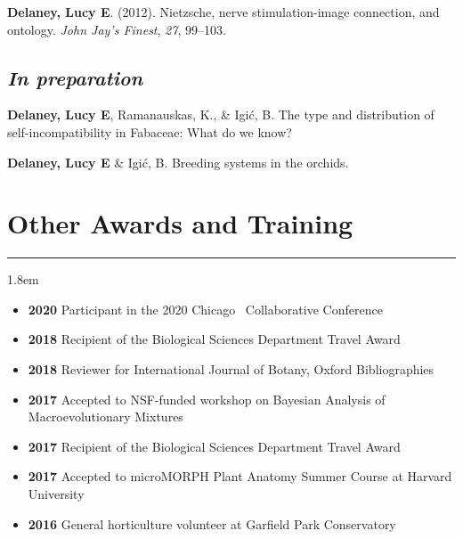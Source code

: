 \documentclass[]{article}
\newlength{\cslhangindent}
\newenvironment{cslreferences}
{\setlength{\parindent}{0pt}
\everypar{\setlength{\hangindent}{\cslhangindent}}\ignorespaces}
{\par}
\begin{document}
\begin{cslreferences}
\textbf{Delaney, Lucy E}. (2012). Nietzsche, nerve stimulation-image connection, and ontology. \emph{John Jay's Finest}, \emph{27}, 99--103. \href{https://ledelaney.org/static/docs/Delaney-JJAYFinest.pdf}{\faFile}\\
\end{cslreferences}

\subsection{\textit{In preparation}}
\vspace{2mm}

\begin{cslreferences}
\textbf{Delaney, Lucy E}, Ramanauskas, K., \& Igić, B. The type and distribution of self-incompatibility in Fabaceae: What do we know?

\textbf{Delaney, Lucy E} \& Igić, B. Breeding systems in the orchids.\\
\end{cslreferences}

\section{Other Awards and Training}
\hrule
\vspace{4mm}
\leftskip 1.8em

\begin{itemize}[label=$\mathwitch*$]
\item{\textbf{2020} Participant in the 2020 Chicago \textcolor{light-gray}{\faRProject}\ Collaborative Conference \href{https://chircollab.github.io/}{\faLink}}
\item{\textbf{2018} Recipient of the Biological Sciences Department Travel Award}
\item{\textbf{2018} Reviewer for International Journal of Botany, Oxford Bibliographies}
\item{\textbf{2017} Accepted to NSF-funded workshop on Bayesian Analysis of Macroevolutionary Mixtures \href{http://bamm-project.org/index.html}{\faLink}}
\item{\textbf{2017} Recipient of the Biological Sciences Department Travel Award}
\item{\textbf{2017} Accepted to microMORPH Plant Anatomy Summer Course at Harvard University \href{https://web.archive.org/web/20170922060558/http://arboretum.harvard.edu/tracing-evolution-form-function/"}{\faLink}}
\item{\textbf{2016} General horticulture volunteer at Garfield Park Conservatory \href{https://garfieldconservatory.org/}{\faLink}}
\end{itemize}
\end{document}
